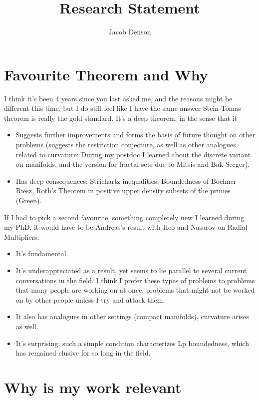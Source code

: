 \documentclass[11pt]{article}
\title{\vspace{-2em}Research Statement}
\author{Jacob Denson}
\date{}
\begin{document}
\maketitle

\section{Favourite Theorem and Why}

I think it's been 4 years since you last asked me, and the reasons might be different this time, but I do still feel like I have the same answer Stein-Tomas theorem is really the gold standard. It's a deep theorem, in the sense that it
%
\begin{itemize}
    \item Suggests further improvements and forms the basis of future thought on other problems (suggests the restriction conjecture, as well as other analogues related to curvature: During my postdoc I learned about the discrete variant on manifolds, and the version for fractal sets due to Mitsis and Bak-Seeger).

    \item Has deep consequences: Strichartz inequalities, Boundedness of Bochner-Riesz, Roth's Theorem in positive upper density subsets of the primes (Green).
\end{itemize}
%
If I had to pick a second favourite, something completely new I learned during my PhD, it would have to be Andreas's result with Heo and Nasarov on Radial Multipliers:
%
\begin{itemize}
    \item It's fundamental.
    \item It's underappreciated as a result, yet seems to lie parallel to several current conversations in the field. I think I prefer these types of problems to problems that many people are working on at once, problems that might not be worked on by other people unless I try and attack them.
    \item It also has analogues in other settings (compact manifolds), curvature arises as well.
    \item It's surprising: such a simple condition characterizes Lp boundedness, which has remained elusive for so long in the field.
\end{itemize}

\section{Why is my work relevant}
\end{document}
